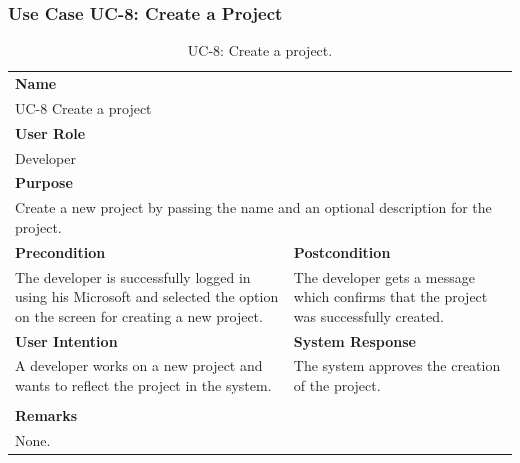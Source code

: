 \subsubsection{Use Case UC-8: Create a Project}\label{subsubsec:use-case-uc-8:-create a project}

\begin{table}[H]
    \centering
    \begin{tabular}{|p{}|p{}|}

        \hline
        \multicolumn{2}{|l|}{\rowcolor{gray!50}\textbf{Name}} \\
        \multicolumn{2}{|l|}{UC-8 Create a project} \\ \hline

        \multicolumn{2}{|l|}{\rowcolor{gray!50}\textbf{User Role}} \\
        \multicolumn{2}{|l|}{Developer} \\ \hline

        \multicolumn{2}{|l|}{\rowcolor{gray!50}\textbf{Purpose}} \\
        \multicolumn{2}{|p{1\textwidth}|}{Create a new project by passing the name and an optional description for the project.} \\ \hline

        \rowcolor{gray!50}\textbf{Precondition} & \rowcolor{gray!50}\textbf{Postcondition} \\
        The developer is successfully logged in using his Microsoft and selected the option on the screen for creating a new project.
        &
        The developer gets a message which confirms that the project was successfully created.\\ \hline

        \rowcolor{gray!50}\textbf{User Intention} & \rowcolor{gray!50}\textbf{System Response} \\
        A developer works on a new project and wants to reflect the project in the system.
        &
        The system approves the creation of the project. \\ \hline

        & \\ \hline

        \multicolumn{2}{|l|}{\rowcolor{gray!50}\textbf{Remarks}} \\
        \multicolumn{2}{|p{1\textwidth}|}{None.} \\ \hline
    \end{tabular}
    \caption{UC-8: Create a project.}
    \label{tab:uc-create-project}
\end{table}

